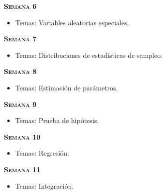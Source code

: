 \documentclass[letterpaper,10pt,onecolumn]{article}
\begin{document}
\noindent\textbf{\textsc{Semana 6}}\\[-0.5cm]
\begin{itemize}
\item Temas:  Variables aleatorias especiales. \\[-0.6cm]  
\end{itemize}


\noindent\textbf{\textsc{Semana 7}}\\[-0.5cm]
\begin{itemize}
\item Temas: Distribuciones de estad\'isticas de sampleo.
\\[-0.6cm] 
\end{itemize}

\noindent\textbf{\textsc{Semana 8}}\\[-0.5cm]
\begin{itemize}
\item Temas: Estimaci\'on de par\'ametros.
\\[-0.6cm] 
\end{itemize}

\noindent\textbf{\textsc{Semana 9}}\\[-0.5cm]
\begin{itemize}
\item Temas: Prueba de hip\'otesis.\\[-0.6cm]   
\end{itemize}


\noindent\textbf{\textsc{Semana 10}}\\[-0.5cm]
\begin{itemize}
\item Temas: Regresi\'on.\\[-0.6cm]
\end{itemize}

\noindent\textbf{\textsc{Semana 11}}\\[-0.5cm]
\begin{itemize}
\item Temas: Integraci\'on. \\[-0.6cm]
\end{itemize}
\end{document}
